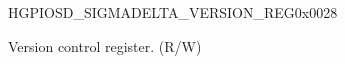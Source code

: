 \begin{register}{H}{GPIOSD\_SIGMADELTA\_VERSION\_REG}{0x{}0028}\label{regdesc:GPIOSDSIGMADELTAVERSIONREG}
%
%
\regnewline%
\begin{regdesc}\begin{reglist}
\label{fielddesc:GPIOSDGPIOSDDATE}\item [GPIO\_SD\_DATE] Version control register. (R/W)
\end{reglist}\end{regdesc}
\end{register}



